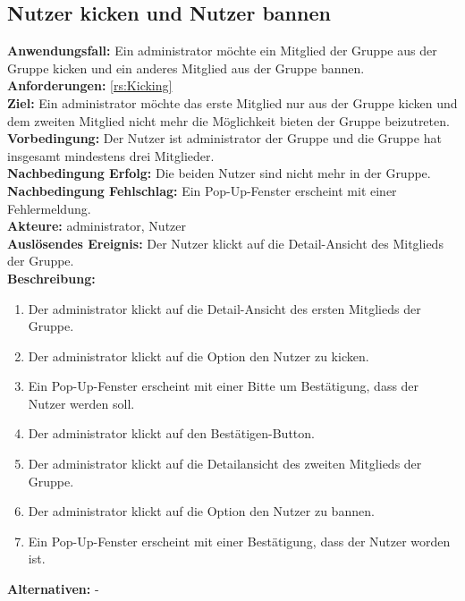 \documentclass[parskip=full]{scrartcl}
\begin{document}
\subsection{Nutzer kicken und Nutzer bannen}
\textbf{Anwendungsfall:} Ein \gls{administrator} möchte ein Mitglied der Gruppe aus der Gruppe \gls{kicken} und ein anderes Mitglied aus der Gruppe \gls{bannen}.\\
\textbf{Anforderungen:} \ref{rs:Kicking}\\
\textbf{Ziel:} Ein \gls{administrator} möchte das erste Mitglied nur aus der Gruppe \gls{kicken} und dem zweiten Mitglied nicht mehr die Möglichkeit bieten der Gruppe beizutreten.\\
\textbf{Vorbedingung:} Der Nutzer ist \gls{administrator} der Gruppe und die Gruppe hat insgesamt mindestens drei Mitglieder.\\
\textbf{Nachbedingung Erfolg:} Die beiden Nutzer sind nicht mehr in der Gruppe.\\
\textbf{Nachbedingung Fehlschlag:} Ein Pop-Up-Fenster erscheint mit einer Fehlermeldung.\\
\textbf{Akteure:} \gls{administrator}, Nutzer\\
\textbf{Auslösendes Ereignis:} Der Nutzer klickt auf die Detail-Ansicht des Mitglieds der Gruppe.\\
\textbf{Beschreibung:}
\begin{enumerate}
    \item Der \gls{administrator} klickt auf die Detail-Ansicht des ersten Mitglieds der Gruppe.
    \item Der \gls{administrator} klickt auf die Option den Nutzer zu \gls{kicken}.
    \item Ein Pop-Up-Fenster erscheint mit einer Bitte um Bestätigung, dass der Nutzer  werden soll.
    \item Der \gls{administrator} klickt auf den Bestätigen-Button.
    \item Der \gls{administrator} klickt auf die Detailansicht des zweiten Mitglieds der Gruppe.
    \item Der \gls{administrator} klickt auf die Option den Nutzer zu \gls{bannen}.
    \item Ein Pop-Up-Fenster erscheint mit einer Bestätigung, dass der Nutzer  worden ist.
\end{enumerate}
\textbf{Alternativen:} -
\newpage
\end{document}
